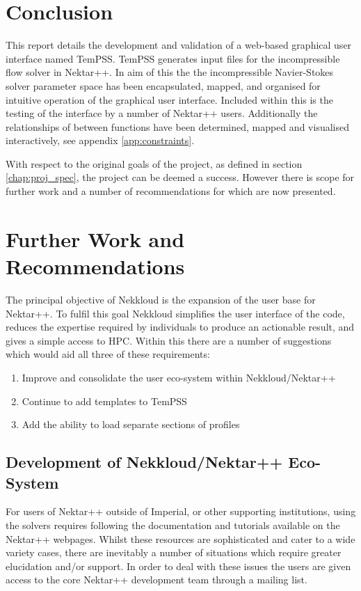 \documentclass[11pt, a4paper]{report}
\begin{document}
\section{Conclusion}
This report details the development and validation of a web-based graphical user interface named TemPSS. TemPSS generates input files for the incompressible flow solver in Nektar++. In aim of this the the incompressible Navier-Stokes solver parameter space has been encapsulated, mapped, and organised for intuitive operation of the graphical user interface. Included within this is the testing of the interface by a number of Nektar++ users. Additionally the relationships of between functions have been determined, mapped and visualised interactively, see appendix \ref{app:constraints}.

With respect to the original goals of the project, as defined in section \ref{chap:proj_spec}, the project can be deemed a success. However there is scope for further work and a number of recommendations for which are now presented.

\section{Further Work and Recommendations}
The principal objective of Nekkloud is the expansion of the user base for Nektar++. To fulfil this goal Nekkloud simplifies the user interface of the code, reduces the expertise required by individuals to produce an actionable result, and gives a simple access to HPC. Within this there are a number of suggestions which would aid all three of these requirements:

\begin{enumerate}
\item Improve and consolidate the user eco-system within Nekkloud/Nektar++
\item Continue to add templates to TemPSS
\item Add the ability to load separate sections of profiles
\end{enumerate}

\subsection{Development of Nekkloud/Nektar++ Eco-System}
For users of Nektar++ outside of Imperial, or other supporting institutions, using the solvers requires following the documentation and tutorials available on the Nektar++ webpages. Whilst these resources are sophisticated and cater to a wide variety cases, there are inevitably a number of situations which require greater elucidation and/or support. In order to deal with these issues the users are given access to the core Nektar++ development team through a mailing list.
\end{document}
